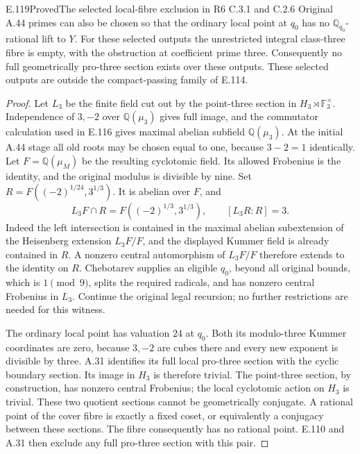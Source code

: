 \begin{result}{E.119}{Proved}{The selected local-fibre exclusion in R6 C.3.1 and C.2.6}
Original A.44 primes can also be chosen so that the ordinary local
point at $q_0$ has no $\mathbb Q_{q_0}$-rational lift to $Y$.
For these selected outputs the unrestricted integral class-three
fibre is empty, with the obstruction at coefficient prime three.
Consequently no full geometrically pro-three section exists over
these outputs. These selected outputs are outside the compact-passing
family of E.114.
\end{result}
\begin{proof}
Let $L_3$ be the finite field cut out by the point-three section in
$H_3\rtimes\mathbb F_3^\times$. Independence of $3,-2$ over
$\mathbb Q(\mu_3)$ gives full image, and the commutator calculation
used in E.116 gives maximal abelian subfield $\mathbb Q(\mu_3)$.
At the initial A.44 stage all old roots may be chosen equal to one,
because $3-2=1$ identically. Let $F=\mathbb Q(\mu_M)$ be the
resulting cyclotomic field. Its allowed Frobenius is the identity,
and the original modulus is divisible by nine. Set
$R=F((-2)^{1/24},3^{1/3})$. It is abelian over $F$, and
\[
 L_3F\cap R=F((-2)^{1/3},3^{1/3}),\qquad [L_3R:R]=3.
\]
Indeed the left intersection is contained in the maximal abelian
subextension of the Heisenberg extension $L_3F/F$, and the
displayed Kummer field is already contained in $R$.
A nonzero central automorphism of $L_3F/F$ therefore extends to
the identity on $R$. Chebotarev supplies an eligible $q_0$, beyond
all original bounds, which is $1\pmod9$, splits the required
radicals, and has nonzero central Frobenius in $L_3$.
Continue the original legal recursion; no further restrictions are
needed for this witness.

The ordinary local point has valuation $24$ at $q_0$. Both its
modulo-three Kummer coordinates are zero, because $3,-2$ are cubes
there and every new exponent is divisible by three.
A.31 identifies its full local pro-three section with the cyclic
boundary section. Its image in $H_3$ is therefore trivial. The
point-three section, by construction, has nonzero central Frobenius;
the local cyclotomic action on $H_3$ is trivial. These two quotient
sections cannot be geometrically conjugate. A rational point of the
cover fibre is exactly a fixed coset, or equivalently a conjugacy
between these sections. The fibre consequently has no rational point.
E.110 and A.31 then exclude any full pro-three section with this pair.


\end{proof}
